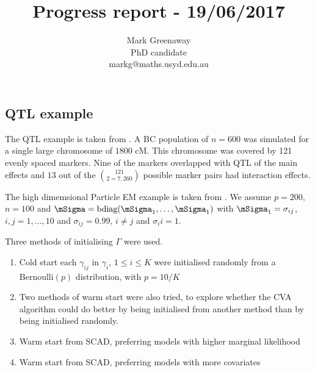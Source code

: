 \documentclass{beamer}
\title{Progress report - 19/06/2017}
\author{Mark Greenaway\\PhD candidate\\markg@maths.usyd.edu.au}
\begin{document}
\begin{frame}
\maketitle
\end{frame}

\subsection{QTL example}
The QTL example is taken from \cite{Xu2007}. A BC population of $n=600$ was simulated for a single large
chromosome of $1800$ cM. This chromosome was covered by 121 evenly spaced markers. Nine of the markers
overlapped with QTL of the main effects and $13$ out of the $121 \choose{2} = 7,260$ possible marker pairs had
interaction effects.

The high dimemsional Particle EM example is taken from \cite{Rockova2016}.
We assume $p = 200$, $n = 100$ and $\mSigma = \text{bdiag}(\mSigma_1, \ldots, \mSigma_1)$ with
$\mSigma_1 = \sigma_{ij}$, $i, j = 1, \ldots, 10$ and $\sigma_{ij} = 0.99$, $i \ne j$ and $\sigma_ii = 1$.

\begin{frame}
Three methods of initialising $\Gamma$ were used.
\begin{enumerate}
\item Cold start each $\gamma_{ij}$ in $\gamma_i$, $1 \leq i \leq K$ were initialised randomly from a
$\text{Bernoulli}(p)$ distribution, with $p = 10 / K$
\item Two methods of warm start were also tried, to explore whether the CVA algorithm could do better by being
initialised from another method than by being initialised randomly. 
\item Warm start from SCAD, preferring models with higher marginal likelihood
\item Warm start from SCAD, preferring models with more covariates
\end{enumerate}
\end{frame}
\end{document}

